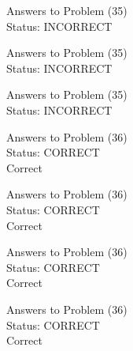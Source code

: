 \documentclass[11pt]{article}
\begin{document}
\begin{minipage}[t]{0.5\textwidth}
  {\centering
  
  Answers to Problem (35)\\
  Status: INCORRECT\\
  
  }
\end{minipage}
\begin{minipage}[t]{0.5\textwidth}
  {\centering
  
  Answers to Problem (35)\\
  Status: INCORRECT\\
  
  }
\end{minipage}
\begin{minipage}[t]{0.5\textwidth}
  {\centering
  
  Answers to Problem (35)\\
  Status: INCORRECT\\
  
  }
\end{minipage}
\begin{minipage}[t]{0.5\textwidth}
  {\centering
  
  Answers to Problem (36)\\
  Status: CORRECT\\
  Correct\\
  }
\end{minipage}
\begin{minipage}[t]{0.5\textwidth}
  {\centering
  
  Answers to Problem (36)\\
  Status: CORRECT\\
  Correct\\
  }
\end{minipage}
\begin{minipage}[t]{0.5\textwidth}
  {\centering
  
  Answers to Problem (36)\\
  Status: CORRECT\\
  Correct\\
  }
\end{minipage}
\begin{minipage}[t]{0.5\textwidth}
  {\centering
  
  Answers to Problem (36)\\
  Status: CORRECT\\
  Correct\\
  }
\end{minipage}
\end{document}
